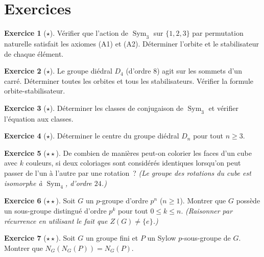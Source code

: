 \documentclass[12pt,a4paper,openany]{book}
\theoremstyle{definition}
\newtheorem{exercice}{Exercice}[chapter]
\DeclareMathOperator{\Sym}{Sym}
\begin{document}
\section{Exercices}\label{sec:exo-ch4}

\begin{exercice}[$\star$]\label{exo:action-verification}
  Vérifier que l'action de $\Sym_3$ sur $\{1,2,3\}$ par permutation
  naturelle satisfait les axiomes (A1) et (A2).
  Déterminer l'orbite et le stabilisateur de chaque élément.
\end{exercice}

\begin{exercice}[$\star$]\label{exo:orbite-stab-D4}
  Le groupe diédral $D_4$ (d'ordre $8$) agit sur les sommets d'un
  carré. Déterminer toutes les orbites et tous les stabilisateurs.
  Vérifier la formule orbite-stabilisateur.
\end{exercice}

\begin{exercice}[$\star$]\label{exo:conjugaison-S3}
  Déterminer les classes de conjugaison de $\Sym_3$ et vérifier
  l'équation aux classes.
\end{exercice}

\begin{exercice}[$\star$]\label{exo:centre-Dn}
  Déterminer le centre du groupe diédral $D_n$ pour tout $n\geq 3$.
\end{exercice}

\begin{exercice}[$\star\star$]\label{exo:burnside-cube}
  De combien de manières peut-on colorier les faces d'un cube avec $k$
  couleurs, si deux coloriages sont considérés identiques lorsqu'on peut
  passer de l'un à l'autre par une rotation~?
  \textit{(Le groupe des rotations du cube est isomorphe à $\Sym_4$,
  d'ordre $24$.)}
\end{exercice}

\begin{exercice}[$\star\star$]\label{exo:p-groupe-sous-groupe-distingue}
  Soit $G$ un $p$-groupe d'ordre $p^n$ ($n\geq 1$). Montrer que $G$
  possède un sous-groupe distingué d'ordre $p^k$ pour tout
  $0\leq k\leq n$.
  \textit{(Raisonner par récurrence en utilisant le fait que
  $Z(G)\neq\{e\}$.)}
\end{exercice}

\begin{exercice}[$\star\star$]\label{exo:normalizer-sylow}
  Soit $G$ un groupe fini et $P$ un Sylow $p$-sous-groupe de $G$.
  Montrer que $N_G(N_G(P)) = N_G(P)$.
\end{exercice}
\end{document}
